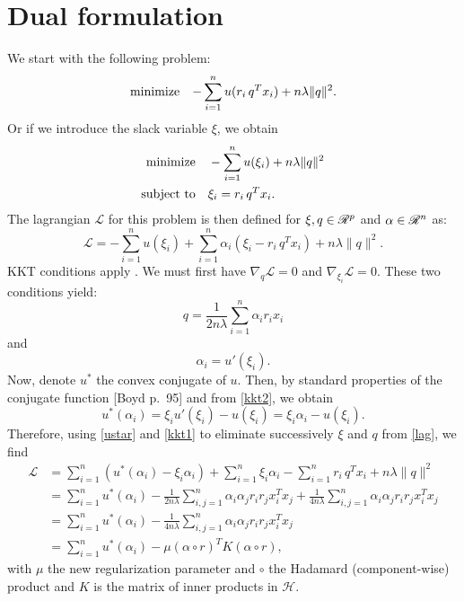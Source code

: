 \documentclass{article}
\newcommand{\lag}{\mathscr{L}}
\newcommand{\sumi}{\sum_{i=1}^n}
\newcommand{\sumij}{\sum_{i,j=1}^n}
\renewcommand{\dd}{\nabla}
\begin{document}
\section{Dual formulation}
We start with the following problem:
\begin{equation*}
  \text{minimize} \quad {-\sum_{i=1}^nu(r_i\,q^Tx_i) + n\lambda\|q\|^2}.
\end{equation*}
Or if we introduce the slack variable $\xi$, we obtain
\begin{align*}
  \minimizeEquationSt{-\sum_{i=1}^nu(\xi_i)+n\lambda\|q\|^2}[\xi_i=r_i\,q^Tx_i].
\end{align*}
The lagrangian $\lag$ for this problem is then defined for
$\xi,q\in\mathscr{R}^p$ and $\alpha\in\mathscr{R}^n$ as:
\begin{equation}
  \label{lag}
  \lag = -\sumi u(\xi_i)+\sumi \alpha_i(\xi_i-r_i\,q^Tx_i)+n\lambda \|q\|^2.
\end{equation}
KKT conditions apply . We must first have
$\dd_q\lag=0$ and $\dd_{\xi_i}\lag=0$. These two conditions yield:
\begin{equation}
  \label{kkt1}
  q = \frac{1}{2n\lambda}\sumi \alpha_ir_ix_i
\end{equation}
and
\begin{equation}
  \label{kkt2}
  \alpha_i = u'(\xi_i).
\end{equation}
Now, denote $u^*$ the convex conjugate of $u$. Then, by standard properties of the
conjugate function [Boyd p.~95] and from \eqref{kkt2}, we obtain
\begin{equation}
  \label{ustar}
  u^*(\alpha_i) = \xi_iu'(\xi_i) - u(\xi_i) = \xi_i\alpha_i - u(\xi_i).
\end{equation}
Therefore, using \eqref{ustar} and \eqref{kkt1} to eliminate successively $\xi$ and $q$
from \eqref{lag}, we find
\begin{align}
  \lag &= \sumi(u^*(\alpha_i)-\xi_i\alpha_i) + \sumi \xi_i\alpha_i 
         - \sumi r_i\,q^Tx_i + n\lambda\|q\|^2 \nonumber\\
       &= \sumi u^*(\alpha_i)
         - \frac{1}{2n\lambda}\sumij \alpha_i\alpha_jr_ir_jx_i^Tx_j
         + \frac{1}{4n\lambda}\sumij \alpha_i\alpha_jr_ir_jx_i^Tx_j \nonumber\\
       &=  \sumi u^*(\alpha_i)
         - \frac{1}{4n\lambda}\sumij \alpha_i\alpha_jr_ir_jx_i^Tx_j\nonumber\\
       &= \sumi u^*(\alpha_i) - \mu(\alpha \circ r)^TK(\alpha \circ r),\label{gen}
\end{align}
with $\mu$ the new regularization parameter and $\circ$ the Hadamard (component-wise)
product and $K$ is the matrix of inner products in $\mathscr{H}$.
\end{document}
